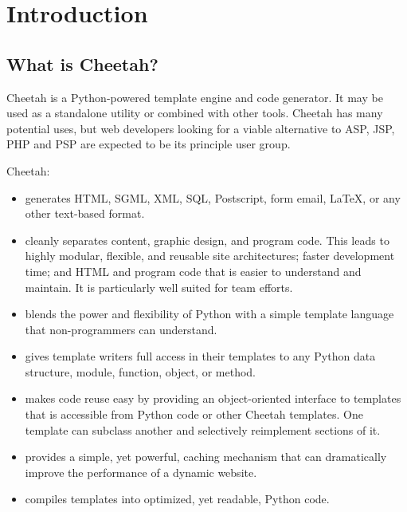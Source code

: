 \section{Introduction}
\label{intro}

\subsection{What is Cheetah?}
\label{intro.whatIs}

Cheetah is a Python-powered template engine and code generator.  It may be used
as a standalone utility or combined with other tools.  Cheetah has
many potential uses, but web developers looking for a viable alternative to ASP,
JSP, PHP and PSP are expected to be its principle user group.

Cheetah:
\begin{itemize}        
\item generates HTML, SGML, XML, SQL, Postscript, form email, LaTeX, or any
     other text-based format.
     
\item cleanly separates content, graphic design, and program code.  This leads
     to highly modular, flexible, and reusable site architectures; faster
     development time; and HTML and program code that is easier to understand
     and maintain. It is particularly well suited for team efforts.
     
\item blends the power and flexibility of Python with a simple template language
     that non-programmers can understand.
     
\item gives template writers full access in their templates to any Python data
     structure, module, function, object, or method.
     
\item makes code reuse easy by providing an object-oriented interface to
     templates that is accessible from Python code or other Cheetah templates.
     One template can subclass another and selectively reimplement sections of
     it.
     
\item provides a simple, yet powerful, caching mechanism that can dramatically
     improve the performance of a dynamic website.
     
\item compiles templates into optimized, yet readable, Python code.
\end{itemize}   

